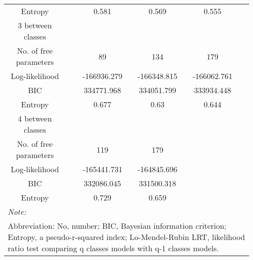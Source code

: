 \documentclass[11pt,a4paper]{article}
\begin{document}
\begin{table}
\begin{tabular}[t]{cccccc}
\hspace{1em}\hspace{1em}Entropy &  & 0.581 & 0.569 & 0.555 & \\
\hspace{1em}3 between classes &  &  &  &  & \\
\hspace{1em}\hspace{1em}No. of free parameters &  & 89 & 134 & 179 & \\
\hspace{1em}\hspace{1em}Log-likelihood &  & -166936.279 & -166348.815 & -166062.761 & \\
\hspace{1em}\hspace{1em}BIC &  & 334771.968 & 334051.799 & 333934.448 & \\
\hspace{1em}\hspace{1em}Entropy &  & 0.677 & 0.63 & 0.644 & \\
\hspace{1em}4 between classes &  &  &  &  & \\
\hspace{1em}\hspace{1em}No. of free parameters &  & 119 & 179 &  & \\
\hspace{1em}\hspace{1em}Log-likelihood &  & -165441.731 & -164845.696 &  & \\
\hspace{1em}\hspace{1em}BIC &  & 332086.045 & 331500.318 &  & \\
\hspace{1em}\hspace{1em}Entropy &  & 0.729 & 0.659 &  & \\
\bottomrule
\multicolumn{6}{l}{\textit{Note: }}\\
\multicolumn{6}{l}{Abbreviation: No, number; BIC, Bayesian information criterion; Entropy, a pseudo-r-squared index; Lo-Mendel-Rubin LRT, likelihood ratio test comparing q classes models with q-1 classes models.}\\
\end{tabular}
\end{table}


\end{document}
